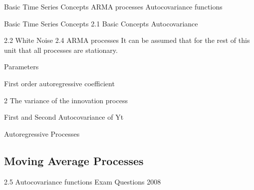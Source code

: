 

Basic Time Series Concepts
ARMA processes
Autocovariance functions


Basic Time Series Concepts
2.1 Basic Concepts
Autocovariance


2.2 White Noise
2.4 ARMA processes
It can be assumed that for the rest of this unit that all processes are stationary.

Parameters

   First order autoregressive coefficient

2 The variance of the innovation process




First and Second Autocovariance of Yt



Autoregressive Processes


\subsection*{Moving Average Processes}


2.5 Autocovariance functions
Exam Questions
2008 


